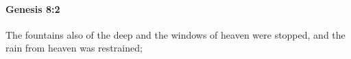 
		\paragraph{Genesis 8:2} %
			\label{GENESIS-8-2}

			The fountains also of the deep and the windows of heaven were stopped, and the rain from heaven was restrained;


